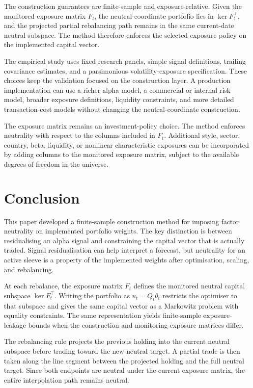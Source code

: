 \documentclass[11pt]{article}
\begin{document}
The construction guarantees are finite-sample and exposure-relative.  Given the monitored exposure
matrix $F_t$, the neutral-coordinate portfolio lies in $\ker F_t^\top$, and the projected partial
rebalancing path remains in the same current-date neutral subspace.  The method therefore enforces the
selected exposure policy on the implemented capital vector.

The empirical study uses fixed research panels, simple signal definitions, trailing covariance estimates,
and a parsimonious volatility-exposure specification.  These choices keep the validation focused on the
construction layer.  A production implementation can use a richer alpha model, a commercial or internal
risk model, broader exposure definitions, liquidity constraints, and more detailed transaction-cost models
without changing the neutral-coordinate construction.

The exposure matrix remains an investment-policy choice.  The method enforces neutrality with respect
to the columns included in $F_t$.  Additional style, sector, country, beta, liquidity, or nonlinear
characteristic exposures can be incorporated by adding columns to the monitored exposure matrix,
subject to the available degrees of freedom in the universe.

\section{Conclusion}

This paper developed a finite-sample construction method for imposing factor neutrality on implemented
portfolio weights.  The key distinction is between residualising an alpha signal and constraining the
capital vector that is actually traded.  Signal residualisation can help interpret a forecast, but neutrality
for an active sleeve is a property of the implemented weights after optimisation, scaling, and
rebalancing.

At each rebalance, the exposure matrix $F_t$ defines the monitored neutral capital subspace
$\ker F_t^\top$.  Writing the portfolio as $u_t=Q_t\theta_t$ restricts the optimiser to that subspace and
gives the same capital vector as a Markowitz problem with equality constraints.  The same representation
yields finite-sample exposure-leakage bounds when the construction and monitoring exposure matrices
differ.

The rebalancing rule projects the previous holding into the current neutral subspace before trading
toward the new neutral target.  A partial trade is then taken along the line segment between the
projected holding and the full neutral target.  Since both endpoints are neutral under the current
exposure matrix, the entire interpolation path remains neutral.
\end{document}
